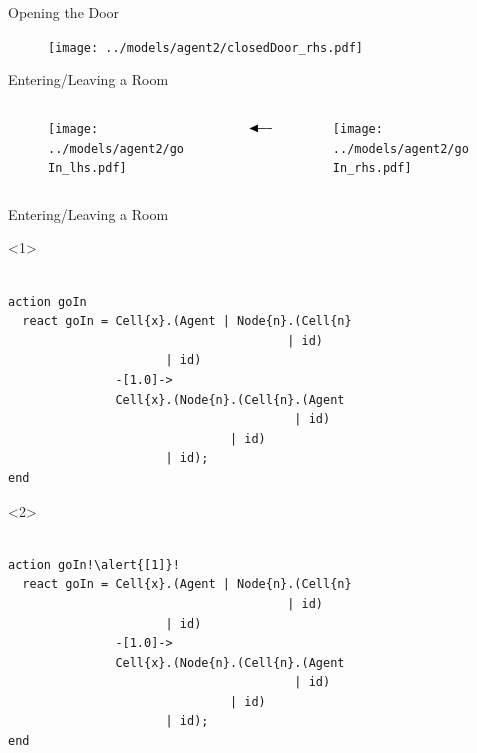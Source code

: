 \documentclass{beamer}
\providecommand\longdoublearrowRHD{\mathrel\LHD\joinrel\relbar\joinrel\relbar\joinrel\mathrel\RHD}
\begin{document}
\begin{frame}{Opening the Door}
  \begin{figure}
    \centering
    \texttt{[image: ../models/agent2/closedDoor\_rhs.pdf]}
  \end{figure}
\end{frame}

\begin{frame}{Entering/Leaving a Room}
  \begin{columns}
    \begin{column}{0.45\textwidth}
      \begin{figure}
        \centering
        \texttt{[image: ../models/agent2/goIn\_lhs.pdf]}
      \end{figure}
    \end{column}
    \begin{column}{0.1\textwidth}
      $\longdoublearrowRHD$
    \end{column}
    \begin{column}{0.45\textwidth}
      \begin{figure}
        \centering
        \texttt{[image: ../models/agent2/goIn\_rhs.pdf]}
      \end{figure}
    \end{column}
  \end{columns}
\end{frame}

\begin{frame}[fragile]{Entering/Leaving a Room}
  \begin{onlyenv}<1>
\begin{lstlisting}

action goIn
  react goIn = Cell{x}.(Agent | Node{n}.(Cell{n}
                                       | id)
                      | id)
               -[1.0]->
               Cell{x}.(Node{n}.(Cell{n}.(Agent
                                        | id)
                               | id)
                      | id);
end

\end{lstlisting}
  \end{onlyenv}
  \begin{onlyenv}<2>
\begin{lstlisting}[escapechar=!]

action goIn!\alert{[1]}!
  react goIn = Cell{x}.(Agent | Node{n}.(Cell{n}
                                       | id)
                      | id)
               -[1.0]->
               Cell{x}.(Node{n}.(Cell{n}.(Agent
                                        | id)
                               | id)
                      | id);
end

\end{lstlisting}
  \end{onlyenv}
\end{frame}
\end{document}
